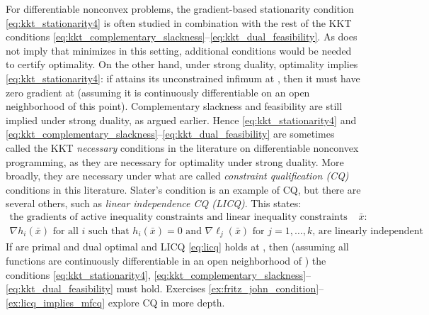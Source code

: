 For differentiable nonconvex problems, the gradient-based stationarity condition
\eqref{eq:kkt_stationarity4} is often studied in combination with the rest of
the KKT conditions
\eqref{eq:kkt_complementary_slackness}--\eqref{eq:kkt_dual_feasibility}. As
 does not imply that
 minimizes  in this
setting, additional conditions would be needed to certify optimality. On the
other hand, under strong duality, optimality implies
\eqref{eq:kkt_stationarity4}: if  attains
its unconstrained infimum at , then it must have zero gradient
at  (assuming it is continuously differentiable on an open
neighborhood of this point). Complementary slackness and feasibility are still
implied under strong duality, as argued earlier. Hence
\eqref{eq:kkt_stationarity4} and
\eqref{eq:kkt_complementary_slackness}--\eqref{eq:kkt_dual_feasibility} are
sometimes called the KKT \emph{necessary} conditions in the literature on
differentiable nonconvex programming, as they are necessary for optimality under
strong duality. More broadly, they are necessary under what are called
\emph{constraint qualification (CQ)} conditions in this literature. Slater's
condition is an example of CQ, but there are several others, such as
\emph{linear independence CQ (LICQ)}. This states:
\begin{multline}
\label{eq:licq} 
\text{the gradients of active inequality constraints and linear
  inequality constraints at $\bar{x}$:} \\ \text{$\nabla h_i(\bar{x})$ for all 
  $i$ such that $h_i(\bar{x}) = 0$ and $\nabla \ell_j(\bar{x})$ for $j =
  1,\dots,k$, are linearly independent}.   
\end{multline}
If  are primal and dual optimal and LICQ
\eqref{eq:licq} holds at , then (assuming all functions are
continuously differentiable in an open neighborhood of ) the
conditions \eqref{eq:kkt_stationarity4},
\eqref{eq:kkt_complementary_slackness}--\eqref{eq:kkt_dual_feasibility} must
hold. Exercises \ref{ex:fritz_john_condition}--\ref{ex:licq_implies_mfcq}
explore CQ in more depth.


